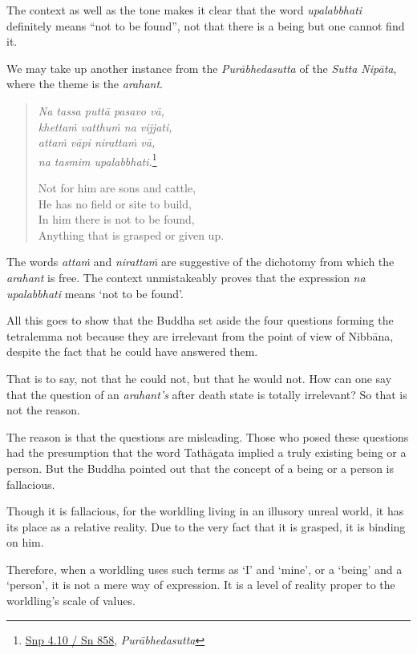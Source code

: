 The context as well as the tone makes it clear that the word \emph{upalabbhati} definitely means ``not to be found'', not that there is a being but one cannot find it.

We may take up another instance from the \emph{Purābhedasutta} of the \emph{Sutta Nipāta}, where the theme is the \emph{arahant}.

\begin{quote}
\emph{Na tassa puttā pasavo vā,}\\
\emph{khettaṁ vatthuṁ na vijjati,}\\
\emph{attaṁ vāpi nirattaṁ vā,}\\
\emph{na tasmim upalabbhati.}\footnote{\href{https://suttacentral.net/snp4.10/pli/ms}{Snp 4.10 / Sn 858}, \emph{Purābhedasutta}}

Not for him are sons and cattle,\\
He has no field or site to build,\\
In him there is not to be found,\\
Anything that is grasped or given up.
\end{quote}

The words \emph{attaṁ} and \emph{nirattaṁ} are suggestive of the dichotomy from which the \emph{arahant} is free. The context unmistakeably proves that the expression \emph{na upalabbhati} means `not to be found'.

All this goes to show that the Buddha set aside the four questions forming the tetralemma not because they are irrelevant from the point of view of Nibbāna, despite the fact that he could have answered them.

That is to say, not that he could not, but that he would not. How can one say that the question of an \emph{arahant's} after death state is totally irrelevant? So that is not the reason.

The reason is that the questions are misleading. Those who posed these questions had the presumption that the word Tathāgata implied a truly existing being or a person. But the Buddha pointed out that the concept of a being or a person is fallacious.

Though it is fallacious, for the worldling living in an illusory unreal world, it has its place as a relative reality. Due to the very fact that it is grasped, it is binding on him.

Therefore, when a worldling uses such terms as `I' and `mine', or a `being' and a `person', it is not a mere way of expression. It is a level of reality proper to the worldling's scale of values.

